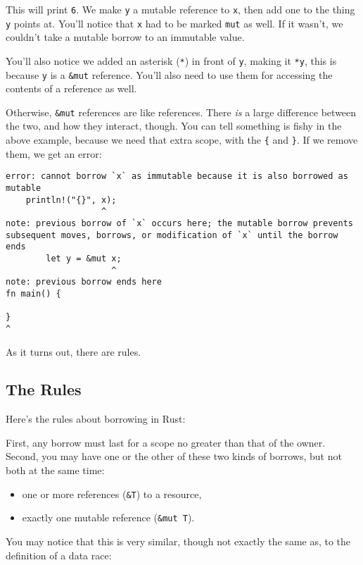 \documentclass[a4paper,]{book}
\begin{document}
This will print \texttt{6}. We make \texttt{y} a mutable reference to
\texttt{x}, then add one to the thing \texttt{y} points at. You'll
notice that \texttt{x} had to be marked \texttt{mut} as well. If it
wasn't, we couldn't take a mutable borrow to an immutable value.

You'll also notice we added an asterisk (\texttt{*}) in front of
\texttt{y}, making it \texttt{*y}, this is because \texttt{y} is a
\texttt{\&mut} reference. You'll also need to use them for accessing the
contents of a reference as well.

Otherwise, \texttt{\&mut} references are like references. There
\emph{is} a large difference between the two, and how they interact,
though. You can tell something is fishy in the above example, because we
need that extra scope, with the \texttt{\{} and \texttt{\}}. If we
remove them, we get an error:

\begin{verbatim}
error: cannot borrow `x` as immutable because it is also borrowed as mutable
    println!("{}", x);
                   ^
note: previous borrow of `x` occurs here; the mutable borrow prevents
subsequent moves, borrows, or modification of `x` until the borrow ends
        let y = &mut x;
                     ^
note: previous borrow ends here
fn main() {

}
^
\end{verbatim}

As it turns out, there are rules.

\subsection{The Rules}\label{the-rules}

Here's the rules about borrowing in Rust:

First, any borrow must last for a scope no greater than that of the
owner. Second, you may have one or the other of these two kinds of
borrows, but not both at the same time:

\begin{itemize}
\itemsep1pt\parskip0pt
\item
  one or more references (\texttt{\&T}) to a resource,
\item
  exactly one mutable reference (\texttt{\&mut\ T}).
\end{itemize}

You may notice that this is very similar, though not exactly the same
as, to the definition of a data race:
\end{document}
